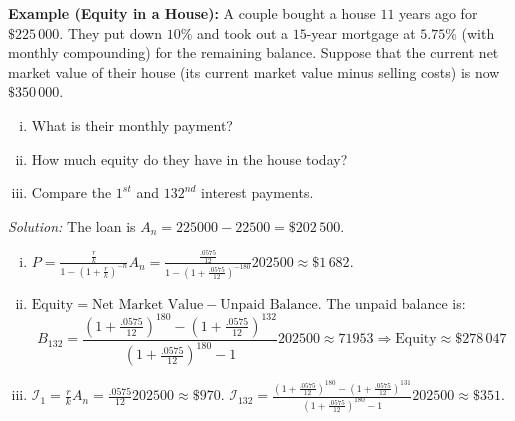 \textbf{Example (Equity in a House): } A couple bought a house \(11\) years ago for \(\$225\,000\). They put down \(10\%\) and took out a \(15\)-year mortgage at \(5.75\%\) (with monthly compounding) for the remaining balance. Suppose that the current net market value of their house (its current market value minus selling costs) is now \(\$350\,000\).
\begin{enumerate}[i.]
    \item What is their monthly payment?
    \item How much equity do they have in the house today?
    \item Compare the \(1^{st}\) and \(132^{nd}\) interest payments.
\end{enumerate}

\textit{Solution: } The loan is \(A_n = 225000-22500 = \$202\,500\).
\begin{enumerate}[i.]
    \item \(P = \frac{\frac{r}{k}}{1 - (1+\frac{r}{k})^{-n}}A_n = \frac{\frac{.0575}{12}}{1 - (1+\frac{.0575}{12})^{-180}}202500 \approx \$1\,682\).

    \item \(\text{Equity} = \text{Net Market Value} - \text{Unpaid Balance}\). The unpaid balance is:
    \begin{equation*}
        B_{132} = \frac{(1+\frac{.0575}{12})^{180} - (1+\frac{.0575}{12})^{132}}{(1+\frac{.0575}{12})^{180} - 1}202500 \approx 71953 \Rightarrow \text{Equity} \approx \$278\,047
    \end{equation*}

    \item \(\mathcal{I}_1 = \frac{r}{k}A_n = \frac{.0575}{12}202500 \approx \$970\). \(\mathcal{I}_{132} = \frac{(1+\frac{.0575}{12})^{180} - (1+\frac{.0575}{12})^{131}}{(1+\frac{.0575}{12})^{180} - 1}202500 \approx \$351\).
\end{enumerate}

